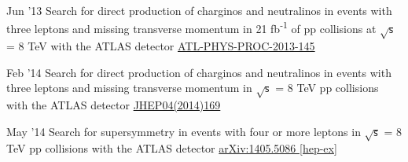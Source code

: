 \documentclass[]{cv} %
\begin{document}
\begin{entrylist}
  \entry
  {Jun '13}
  {{\normalfont Search for direct production of charginos and neutralinos in events with three leptons and missing transverse momentum in 21
    fb\textsuperscript{-1} of pp collisions at $\sqrt{\mathsf{s}}$ = 8 TeV with the ATLAS detector}}
  {\href{https://cds.cern.ch/record/1554811}{ATL-PHYS-PROC-2013-145}}
  {\vspace*{\spacingPubs}}

  \entry
  {Feb '14}
  {{\normalfont Search for direct production of charginos and neutralinos in events with three leptons and missing transverse momentum in $\sqrt{\mathsf{s}}$ =
  8 TeV pp collisions with the ATLAS detector}}
  {\href{http://dx.doi.org/10.1007/JHEP04(2014)169}{JHEP04(2014)169}}
  {\vspace*{\spacingPubs}}

  \entry
  {May '14}
  {{\normalfont Search for supersymmetry in events with four or more leptons in $\sqrt{\mathsf{s}}$ = 8 TeV pp collisions with the ATLAS detector}}
  {\href{http://arxiv.org/abs/1405.5086}{arXiv:1405.5086 [hep-ex]}}
  {\vspace*{\spacingPubs}}

\end{entrylist}

\ifinternalNotes
\end{document}
